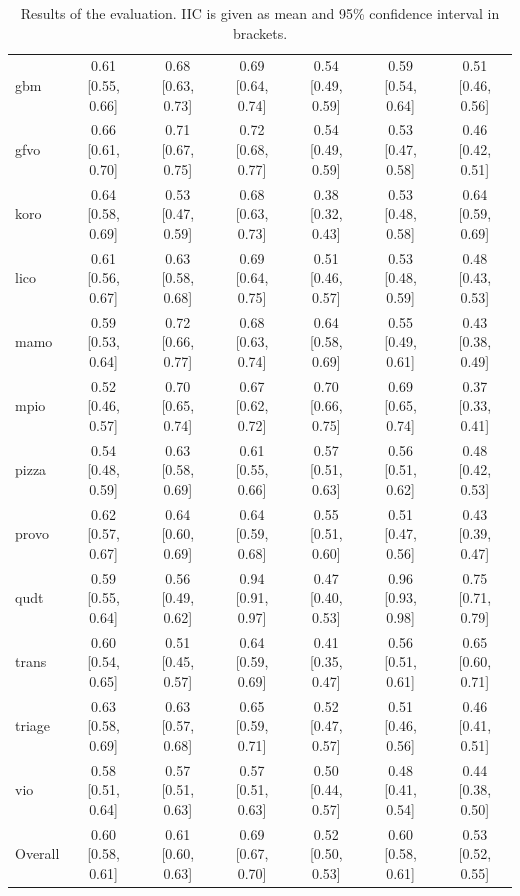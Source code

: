 \begin{table}[htbp]
\begin{widepage}
\begin{tabular}{|l|cccccc|}
      gbm & 0.61 [0.55, 0.66] & 0.68 [0.63, 0.73] & 0.69 [0.64, 0.74] & 0.54 [0.49, 0.59] & 0.59 [0.54, 0.64] & 0.51 [0.46, 0.56] \\
      gfvo & 0.66 [0.61, 0.70] & 0.71 [0.67, 0.75] & 0.72 [0.68, 0.77] & 0.54 [0.49, 0.59] & 0.53 [0.47, 0.58] & 0.46 [0.42, 0.51] \\
      koro & 0.64 [0.58, 0.69] & 0.53 [0.47, 0.59] & 0.68 [0.63, 0.73] & 0.38 [0.32, 0.43] & 0.53 [0.48, 0.58] & 0.64 [0.59, 0.69] \\
      lico & 0.61 [0.56, 0.67] & 0.63 [0.58, 0.68] & 0.69 [0.64, 0.75] & 0.51 [0.46, 0.57] & 0.53 [0.48, 0.59] & 0.48 [0.43, 0.53] \\
      mamo & 0.59 [0.53, 0.64] & 0.72 [0.66, 0.77] & 0.68 [0.63, 0.74] & 0.64 [0.58, 0.69] & 0.55 [0.49, 0.61] & 0.43 [0.38, 0.49] \\
      mpio & 0.52 [0.46, 0.57] & 0.70 [0.65, 0.74] & 0.67 [0.62, 0.72] & 0.70 [0.66, 0.75] & 0.69 [0.65, 0.74] & 0.37 [0.33, 0.41] \\
      pizza & 0.54 [0.48, 0.59] & 0.63 [0.58, 0.69] & 0.61 [0.55, 0.66] & 0.57 [0.51, 0.63] & 0.56 [0.51, 0.62] & 0.48 [0.42, 0.53] \\
      provo & 0.62 [0.57, 0.67] & 0.64 [0.60, 0.69] & 0.64 [0.59, 0.68] & 0.55 [0.51, 0.60] & 0.51 [0.47, 0.56] & 0.43 [0.39, 0.47] \\
      qudt & 0.59 [0.55, 0.64] & 0.56 [0.49, 0.62] & 0.94 [0.91, 0.97] & 0.47 [0.40, 0.53] & 0.96 [0.93, 0.98] & 0.75 [0.71, 0.79] \\
      trans & 0.60 [0.54, 0.65] & 0.51 [0.45, 0.57] & 0.64 [0.59, 0.69] & 0.41 [0.35, 0.47] & 0.56 [0.51, 0.61] & 0.65 [0.60, 0.71] \\
      triage & 0.63 [0.58, 0.69] & 0.63 [0.57, 0.68] & 0.65 [0.59, 0.71] & 0.52 [0.47, 0.57] & 0.51 [0.46, 0.56] & 0.46 [0.41, 0.51] \\
      vio & 0.58 [0.51, 0.64] & 0.57 [0.51, 0.63] & 0.57 [0.51, 0.63] & 0.50 [0.44, 0.57] & 0.48 [0.41, 0.54] & 0.44 [0.38, 0.50]\\
      \hline
      Overall & 0.60 [0.58, 0.61] & 0.61 [0.60, 0.63] & 0.69 [0.67, 0.70] & 0.52 [0.50, 0.53] & 0.60 [0.58, 0.61] & 0.53 [0.52, 0.55] \\
      \hline
    \end{tabular}
  \end{widepage}
  \caption{Results of the evaluation. IIC is given as mean and 95\% confidence interval in brackets.}
\end{table}

